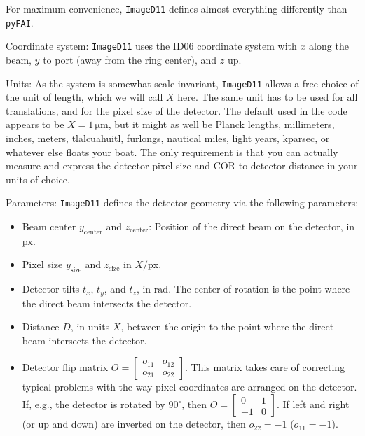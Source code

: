 \documentclass[12pt]{article}
\begin{document}
For maximum convenience, \texttt{ImageD11} defines almost everything
differently than \texttt{pyFAI}.

Coordinate system: \texttt{ImageD11} uses the ID06 coordinate system
with $x$ along the beam, $y$ to port (away from the ring center), and
$z$ up.

Units: As the system is somewhat scale-invariant, \texttt{ImageD11}
allows a free choice of the unit of length, which we will call $X$
here. The same unit has to be used for all translations, and for the
pixel size of the detector. The default used in the code appears to be
$X = 1\,\mathrm{\mu m}$, but it might as well be Planck lengths,
millimeters, inches, meters, tlalcuahuitl, furlongs, nautical miles,
light years, kparsec, or whatever else floats your boat. The only
requirement is that you can actually measure and express the detector
pixel size and COR-to-detector distance in your units of choice.

Parameters: \texttt{ImageD11} defines the detector geometry via the
following parameters:

\begin{itemize}
\item Beam center $y_{\mathrm{center}}$ and $z_{\mathrm{center}}$:
  Position of the direct beam on the detector, in $\mathrm{px}$.
\item Pixel size $y_{\mathrm{size}}$ and $z_{\mathrm{size}}$ in
  ${X}/{\mathrm{px}}$.
\item Detector tilts $t_x$, $t_y$, and $t_z$, in $\mathrm{rad}$. The
  center of rotation is the point where the direct beam intersects the
  detector.
\item Distance $D$, in units $X$, between the origin to the point
  where the direct beam intersects the detector.
\item Detector flip matrix $O = \begin{bmatrix} o_{11} & o_{12}
  \\ o_{21} & o_{22} \end{bmatrix}$. This matrix takes care of
  correcting typical problems with the way pixel coordinates are
  arranged on the detector. If, e.g., the detector is rotated by
  $90^{\circ}$, then $O=\begin{bmatrix} 0 & 1 \\ -1 &
  0\end{bmatrix}$. If left and right (or up and down) are inverted on the
  detector, then $o_{22} = -1$ ($o_{11}=-1$).
\end{itemize}
\end{document}
